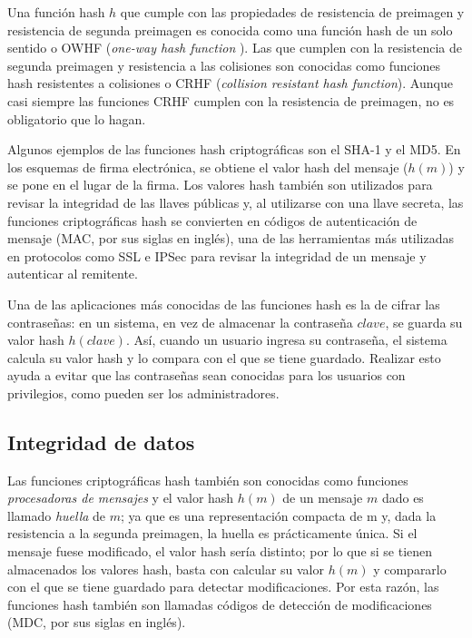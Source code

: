 Una función hash $h$ que cumple con las propiedades de resistencia de
preimagen y resistencia de segunda preimagen es conocida como una 
función hash de un solo sentido o OWHF (\textit{one-way hash function}
). Las que cumplen con la resistencia de segunda preimagen y 
resistencia a las colisiones son conocidas como funciones hash 
resistentes a colisiones o CRHF 
(\textit{collision resistant hash function}). Aunque casi siempre las 
funciones CRHF cumplen con la resistencia de preimagen, no es 
obligatorio que lo hagan.

Algunos ejemplos de las funciones hash criptográficas son el SHA-1 y el 
MD5. En los esquemas de firma electrónica, se obtiene el valor hash del
mensaje ($h(m)$) y se pone en el lugar de la firma. Los valores hash 
también son utilizados para revisar la integridad de las llaves 
públicas y, al utilizarse con una llave secreta, las funciones 
criptográficas hash se convierten en códigos de autenticación de 
mensaje (MAC, por sus siglas en inglés), una de las herramientas más 
utilizadas en protocolos como SSL e IPSec para revisar la integridad de 
un mensaje y autenticar al remitente.

Una de las aplicaciones más conocidas de las funciones hash es la de
cifrar las contraseñas: en un sistema, en vez de almacenar la contraseña
$clave$, se guarda su valor hash $h(clave)$. Así, cuando un usuario 
ingresa su contraseña, el sistema calcula su valor hash y lo compara con
el que se tiene guardado. Realizar esto ayuda a evitar que las 
contraseñas sean conocidas para los usuarios con privilegios, como 
pueden ser los administradores.

\subsection{Integridad de datos}
Las funciones criptográficas hash también son conocidas como funciones
\textit{procesadoras de mensajes} y el valor hash $h(m)$ de un mensaje
$m$ dado es llamado \textit{huella} de $m$; ya que es una representación
compacta de m y, dada la resistencia a la segunda preimagen, la huella 
es prácticamente única. Si el mensaje fuese modificado, el valor hash
sería distinto; por lo que si se tienen almacenados los valores hash, 
basta con calcular su valor $h(m)$ y compararlo con el que se tiene 
guardado para detectar modificaciones. Por esta razón, las funciones
hash también son llamadas códigos de detección de modificaciones (MDC, 
por sus siglas en inglés).


